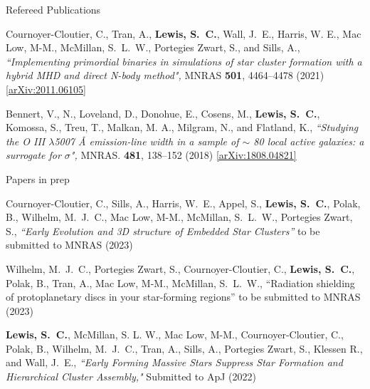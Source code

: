 \documentclass{resume} %
\begin{document}
\begin{rSection}{Refereed Publications}

\begin{etaremune}
 
\item {Cournoyer-Cloutier}, C., {Tran}, A., \textbf{{Lewis}, S.~C.}, {Wall}, J.~E., {Harris}, W. E., {Mac Low}, M-M., {McMillan}, S.~L.~W., {Portegies Zwart}, S., and {Sills}, A., \textit{``Implementing primordial binaries in simulations of star cluster formation with a hybrid MHD and direct N-body method",} MNRAS \textbf{501}, 4464--4478 (2021) \href{https://arxiv.org/abs/2011.06105}{[arXiv:2011.06105]}
  
\item {Bennert}, V., N., {Loveland}, D., {Donohue}, E., {Cosens}, M., \textbf{{Lewis}, S.~C.}, {Komossa}, S., {Treu}, T., {Malkan}, M. A., {Milgram}, N., and {Flatland}, K., \textit{``Studying the O III $\lambda$5007 Å emission-line width in a sample of $\sim$ 80 local active galaxies: a surrogate for $\sigma$",} MNRAS. \textbf{481}, 138--152 (2018) \href{https://arxiv.org/abs/1808.04821}{[arXiv:1808.04821]}
\end{etaremune}

\end{rSection}


\begin{rSection}{Papers in prep}
\begin{etaremune}
\item {Cournoyer-Cloutier}, C., {Sills}, A., {Harris}, W.~E., {Appel}, S., \textbf{{Lewis}, S.~C.}, {Polak}, B., {Wilhelm}, M.~J.~C., {Mac Low}, M-M., {McMillan}, S.~L.~W., {Portegies Zwart}, S., \textit{``Early Evolution and 3D structure of Embedded Star Clusters''} to be submitted to MNRAS (2023)

\item {Wilhelm}, M.~J.~C., {Portegies Zwart}, S., {Cournoyer-Cloutier}, C., \textbf{{Lewis}, S.~C.}, {Polak}, B., {Tran}, A., {Mac Low}, M-M., {McMillan}, S.~L.~W., ``Radiation shielding of protoplanetary discs in your star-forming regions'' to be submitted to MNRAS (2023)

\item \textbf{{Lewis}, S.~C.}, {McMillan}, S. L. W., {Mac Low}, M-M., {Cournoyer-Cloutier}, C., {Polak}, B., {Wilhelm}, M.~J.~C., {Tran}, A., {Sills}, A., {Portegies Zwart}, S., {Klessen} R., and {Wall}, J.~E., \textit{``Early Forming Massive Stars Suppress Star Formation and Hierarchical Cluster Assembly,"} Submitted to ApJ (2022) %

\end{etaremune}
\end{rSection}
\end{document}
